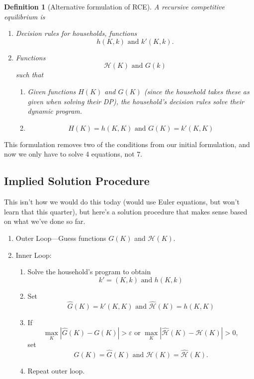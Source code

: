 \documentclass[11pt]{article}
\newtheorem*{definition}{Definition}
\begin{document}
\begin{definition}[Alternative formulation of RCE]
A recursive competitive equilibrium is
\begin{enumerate}
\item Decision rules for households, functions
\[
h(K, k) \text{ and } k'(K, k). 
\]
\item Functions
\[
\mathcal{H}(K) \text{ and }G (k)
\]
such that 
\begin{enumerate}[label=(\alph*)]
\item Given functions $H(K)$ and $G(K)$ (since the household takes these as given when solving their DP), the household's decision rules solve their dynamic program.
\item
\[
H(K) = h(K, K) \text{ and } G(K) = k'(K, K)
\]
\end{enumerate}
\end{enumerate}
\end{definition}
This formulation removes two of the conditions from our initial formulation, and now we only have to solve 4 equations, not 7. 

\subsection{Implied Solution Procedure}
\label{sec:orge7e4406}
This isn't how we would do this today (would use Euler equations, but won't learn that this quarter), but here's a solution procedure that makes sense based on what we've done so far.

\begin{enumerate}
\item Outer Loop---Guess functions $G(K)$ and $\mathcal{H}(K)$.
\item Inner Loop:
\begin{enumerate}
\item Solve the household's program to obtain
\[
k' = (K, k) \text{ and } h(K, k)
\]
\item Set 
\[
\hat{G}(K) = k'(K, K) \text{ and } \hat{\mathcal{H}}(K) = h(K, K)
\]
\item If 
\[
\max_K |\hat{G}(K) - G(K)| > \varepsilon \text{ or } \max_K |\hat{\mathcal{H}}(K) - \mathcal{H}(K)| > 0,
\]
set 
\[
G(K) = \hat{G}(K) \text{ and }\mathcal{H}(K) = \hat{\mathcal{H}}(K).
\]
\item Repeat outer loop.
\end{enumerate}
\end{enumerate}
\end{document}
